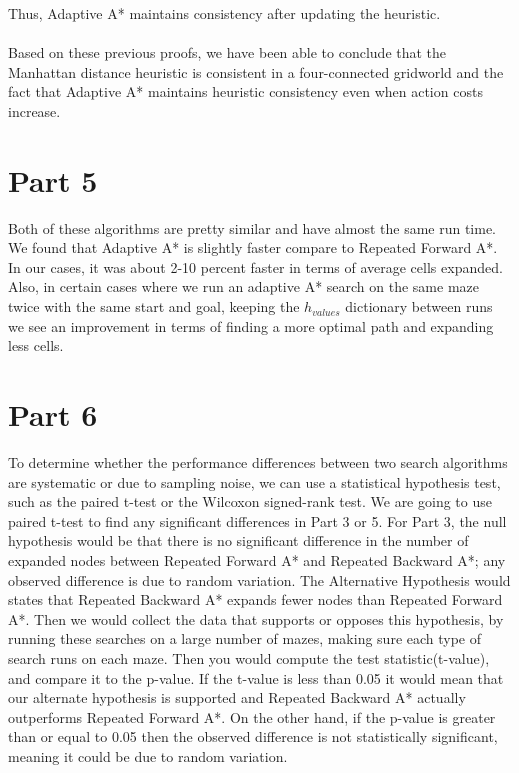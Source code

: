 \documentclass{article}
\begin{document}
Thus, Adaptive A* maintains consistency after updating the heuristic.

\paragraph{}
Based on these previous proofs, we have been able to conclude that the Manhattan distance heuristic is consistent in a four-connected gridworld and the fact that Adaptive A* maintains heuristic consistency even when action costs increase.

\section{Part 5}
Both of these algorithms are pretty similar and have almost the same run time. We found that Adaptive A* is slightly faster compare to Repeated Forward A*. In our cases, it was about 2-10 percent faster in terms of average cells expanded. Also, in certain cases where we run an adaptive A* search on the same maze twice with the same start and goal, keeping the $h_{values}$ dictionary between runs we see an improvement in terms of finding a more optimal path and expanding less cells. 

\section{Part 6}
To determine whether the performance differences between two search algorithms are systematic or due to sampling noise, we can use a statistical hypothesis test, such as the paired t-test or the Wilcoxon signed-rank test. We are going to use paired t-test to find any significant differences in Part 3 or 5. For Part 3, the null hypothesis would be that there is no significant difference in the number of expanded nodes between Repeated Forward A* and Repeated Backward A*; any observed difference is due to random variation. The Alternative Hypothesis would states that Repeated Backward A* expands fewer nodes than Repeated Forward A*. Then we would collect the data that supports or opposes this hypothesis, by running these searches on a large number of mazes, making sure each type of search runs on each maze. Then you would compute the test statistic(t-value), and compare it to the p-value. If the t-value is less than 0.05 it would mean that our alternate hypothesis is supported and Repeated Backward A* actually outperforms Repeated Forward A*. On the other hand, if the p-value is greater than or equal to 0.05 then the observed difference is not statistically significant, meaning it could be due to random variation.
\end{document}
